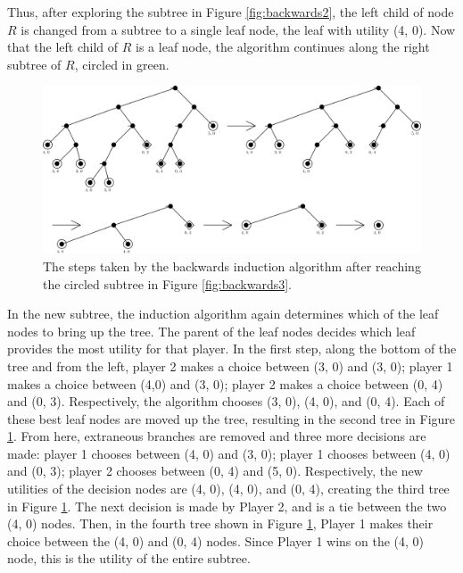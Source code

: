 Thus, after exploring the subtree in Figure \ref{fig:backwards2}, the left child of node $R$ is changed from a subtree to a single leaf node, the leaf with utility (4, 0). Now that the left child of $R$ is a leaf node, the algorithm continues along the right subtree of $R$, circled in green.\\

\begin{figure}[H]
  \centering
  \includegraphics[width=14cm]{figures/Backwards4.png}
  \caption{The steps taken by the backwards induction algorithm after reaching the circled subtree in Figure \ref{fig:backwards3}.}
  \label{fig:backwards4}
\end{figure}

In the new subtree, the induction algorithm again determines which of the leaf nodes to bring up the tree. The parent of the leaf nodes decides which leaf provides the most utility for that player. In the first step, along the bottom of the tree and from the left, player 2 makes a choice between (3, 0) and (3, 0); player 1 makes a choice between (4,0) and (3, 0); player 2 makes a choice between (0, 4) and (0, 3). Respectively, the algorithm chooses (3, 0), (4, 0), and (0, 4). Each of these best leaf nodes are moved up the tree, resulting in the second tree in Figure \ref{fig:backwards4}. From here, extraneous branches are removed and three more decisions are made: player 1 chooses between (4, 0) and (3, 0); player 1 chooses between (4, 0) and (0, 3); player 2 chooses between (0, 4) and (5, 0). Respectively, the new utilities of the decision nodes are (4, 0), (4, 0), and (0, 4), creating the third tree in Figure \ref{fig:backwards4}. The next decision is made by Player 2, and is a tie between the two (4, 0) nodes. Then, in the fourth tree shown in Figure \ref{fig:backwards4}, Player 1 makes their choice between the (4, 0) and (0, 4) nodes. Since Player 1 wins on the (4, 0) node, this is the utility of the entire subtree.\\

